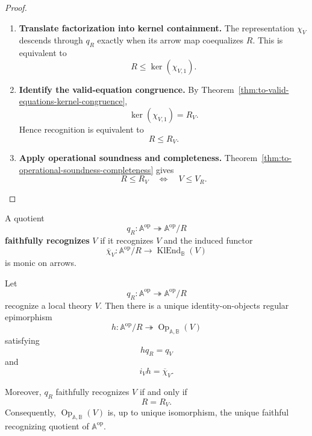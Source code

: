 \begin{proof}
    \leavevmode
    \begin{enumerate}
        \item \textbf{Translate factorization into kernel containment.}
        The representation \(\chi_V\) descends through \(q_R\) exactly when
        its arrow map coequalizes \(R\). This is equivalent to
        \[
            R\leq\ker(\chi_{V,1}).
        \]

        \item \textbf{Identify the valid-equation congruence.}
        By Theorem~\ref{thm:to-valid-equations-kernel-congruence},
        \[
            \ker(\chi_{V,1})=R_V.
        \]
        Hence recognition is equivalent to
        \[
            R\leq R_V.
        \]

        \item \textbf{Apply operational soundness and completeness.}
        Theorem~\ref{thm:to-operational-soundness-completeness} gives
        \[
            R\leq R_V
            \quad\Longleftrightarrow\quad
            V\leq V_R.
        \]
    \end{enumerate}
\end{proof}

\begin{definition}
\label{def:to-faithful-recognition}
    A quotient
    \[
        q_R:
        \mathbb A^{\mathrm{op}}
        \twoheadrightarrow
        \mathbb A^{\mathrm{op}}/R
    \]
    \textbf{faithfully recognizes} \(V\) if it recognizes \(V\) and the
    induced functor
    \[
        \overline\chi_V:
        \mathbb A^{\mathrm{op}}/R
        \to
        \operatorname{KlEnd}_{\mathbb B}(V)
    \]
    is monic on arrows.
\end{definition}

\begin{theorem}
\label{thm:to-universal-faithful-recognition}
    Let
    \[
        q_R:
        \mathbb A^{\mathrm{op}}
        \twoheadrightarrow
        \mathbb A^{\mathrm{op}}/R
    \]
    recognize a local theory \(V\). Then there is a unique
    identity-on-objects regular epimorphism
    \[
        h:
        \mathbb A^{\mathrm{op}}/R
        \twoheadrightarrow
        \operatorname{Op}_{\mathbb A,\mathbb B}(V)
    \]
    satisfying
    \[
        hq_R=q_V
    \]
    and
    \[
        i_Vh=\overline\chi_V.
    \]

    Moreover, \(q_R\) faithfully recognizes \(V\) if and only if
    \[
        R=R_V.
    \]
    Consequently, \(\operatorname{Op}_{\mathbb A,\mathbb B}(V)\) is, up to
    unique isomorphism, the unique faithful recognizing quotient of
    \(\mathbb A^{\mathrm{op}}\).
\end{theorem}

